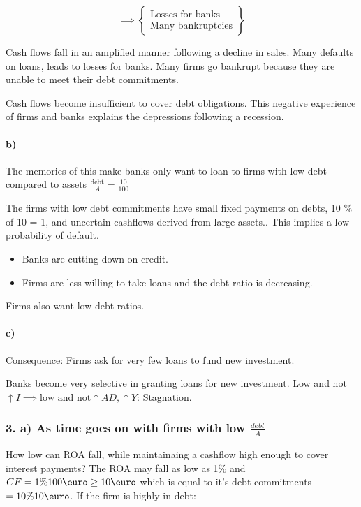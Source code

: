 \documentclass{report}
\begin{document}
$$ \implies \left\{\begin{array}{r}
     \text{Losses for banks}  \\
     \text{Many bankruptcies} 
\end{array} \right\}$$



Cash flows fall in an amplified manner following a decline in sales. Many defaults on loans, leads to losses for banks. Many firms go bankrupt because they are unable to meet their debt commitments. 

Cash flows become insufficient to cover debt obligations. This negative experience of firms and banks explains the depressions following a recession.

\paragraph{b)}  The memories of this make banks only want to loan to firms with low debt compared to assets $\frac{\text{debt}}{A} = \frac{10}{100}$

The firms with low debt commitments have small fixed payments on  debts, 10 \% of 10 = 1, and uncertain cashflows derived from large assets.. This implies a low probability of default.  
\begin{itemize}
    \item Banks are cutting down on credit. 
    \item Firms are less willing to take loans and the debt ratio is decreasing.
\end{itemize}

Firms also want low debt ratios. 

\paragraph{c)} Consequence:
Firms ask for very few loans to fund new investment. 

Banks become very selective in granting loans for new investment. Low and not $\uparrow I \implies \text{low and not} \uparrow AD, \uparrow Y$: Stagnation. 

\subsubsection{3. a) As time goes on with firms with low $\frac{debt}{A}$}

How low can ROA fall, while maintainaing a cashflow high enough to cover interest payments? The ROA may fall as low as 1\% and $CF=1\%100\text{\euro}\geq10\text{\euro}$ which is equal to it's debt commitments $=10\%10\text{\euro}$. 
If the firm is highly in debt:
\end{document}
